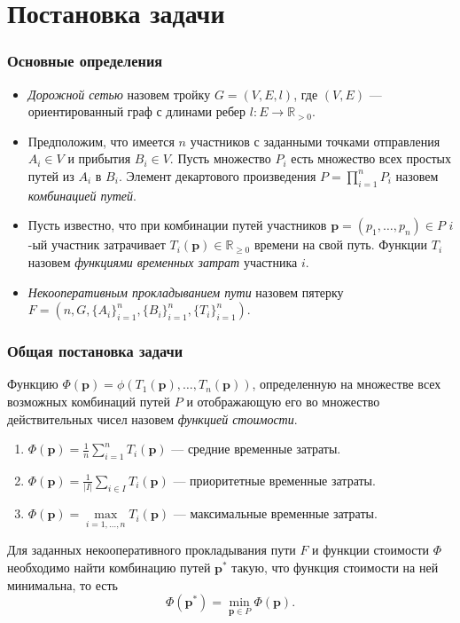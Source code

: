 \documentclass{beamer}
\DeclareMathOperator*{\minn}{min}
\begin{document}
\section{Постановка задачи}

\begin{frame}\frametitle{Основные определения}
  \begin{itemize}
	\item   \emph{Дорожной сетью} назовем тройку $G = (V, E, l)$, где $(V, E)$ --- ориентированный граф с длинами ребер $l: E \rightarrow \mathbb{R}_{>0} $.
	
	\item Предположим, что имеется $n$ участников с заданными точками отправления $A_i \in V$ и прибытия $B_i \in V$. Пусть множество $P_i$ есть множество всех простых путей из $A_i$ в $B_i$. Элемент декартового произведения ${P = \prod \limits_{i = 1} ^ n P_i}$ назовем \emph{комбинацией путей}.
	
	\item Пусть известно, что при комбинации путей участников $\textbf{p} = \left(p_1, \ldots, p_n\right)\in P$ $i$-ый участник затрачивает $T_i(\textbf{p}) \in \mathbb{R}_{\ge 0}$ времени на свой путь.  Функции $T_i$ назовем \textit{функциями временных затрат} участника $i$.
	
	\item \textit{Некооперативным прокладыванием пути} назовем пятерку $F=(n, G, \{A_i\}_{i = 1}^{n}, \{B_i\}_{i = 1}^{n}, \{T_i\}_{i = 1}^{n})$.
\end{itemize}
\end{frame}

\begin{frame}\frametitle{Общая постановка задачи}
 
  	
    Функцию $\Phi (\textbf{p}) = \phi (T_1 (\textbf{p}), \ldots, T_n(\textbf{p}))$, определенную на множестве всех возможных комбинаций путей $P$ и отображающую его во множество действительных чисел назовем \textit{функцией стоимости}.
  	\begin{enumerate}
  		\item  $\Phi (\textbf{p}) = \frac{1}{n}\sum\limits_{i = 1}^n T_i (\textbf{p})$ --- средние временные затраты. 
  		\item  $\Phi (\textbf{p}) = \frac{1}{|I|}\sum\limits_{i \in I} T_i (\textbf{p})$ --- приоритетные временные затраты.
  		\item  $\Phi (\textbf{p}) = \max\limits_{i = 1, \ldots, n} T_i (\textbf{p})$ --- максимальные временные затраты.
  	\end{enumerate}
  
  	\bigskip
	Для заданных некооперативного прокладывания пути $F$ и функции стоимости $\Phi$ необходимо найти комбинацию путей $\textbf{p}^*$ такую, что функция стоимости на ней минимальна, то есть
	\begin{equation}
		\Phi (\textbf{p}^*) = \minn\limits_{ \textbf{p} \in P} \Phi (\textbf{p}).
	\end{equation}
  	
\end{frame}
\end{document}
